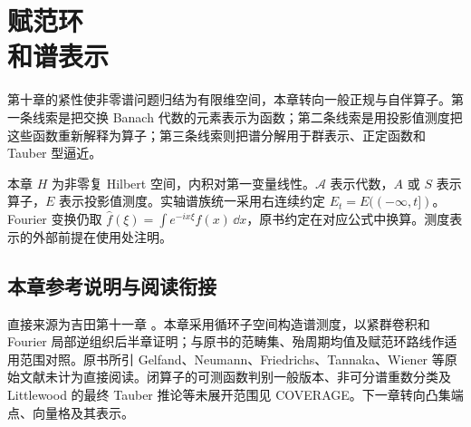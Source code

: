\chapter[赋范环和谱表示]{赋范环\\和谱表示}\label{ch:yosida-11}

第十章的紧性使非零谱问题归结为有限维空间，本章转向一般正规与自伴算子。第一条线索是把交换 Banach 代数的元素表示为函数；第二条线索是用投影值测度把这些函数重新解释为算子；第三条线索则把谱分解用于群表示、正定函数和 Tauber 型逼近。

本章 $H$ 为非零复 Hilbert 空间，内积对第一变量线性。$\mathcal A$ 表示代数，$A$ 或 $S$ 表示算子，$E$ 表示投影值测度。实轴谱族统一采用右连续约定 $E_t=E((-\infty,t])$。Fourier 变换仍取 $\widehat f(\xi)=\int e^{-ix\xi}f(x)\,\dd x$，原书约定在对应公式中换算。测度表示的外部前提在使用处注明。


















\section*{本章参考说明与阅读衔接}
直接来源为吉田第十一章 \cite{yosida-zh,yosida-en}。本章采用循环子空间构造谱测度，以紧群卷积和 Fourier 局部逆组织后半章证明；与原书的范畴集、殆周期均值及赋范环路线作适用范围对照。原书所引 Gelfand、Neumann、Friedrichs、Tannaka、Wiener 等原始文献未计为直接阅读。闭算子的可测函数判别一般版本、非可分谱重数分类及 Littlewood 的最终 Tauber 推论等未展开范围见 COVERAGE。下一章转向凸集端点、向量格及其表示。
